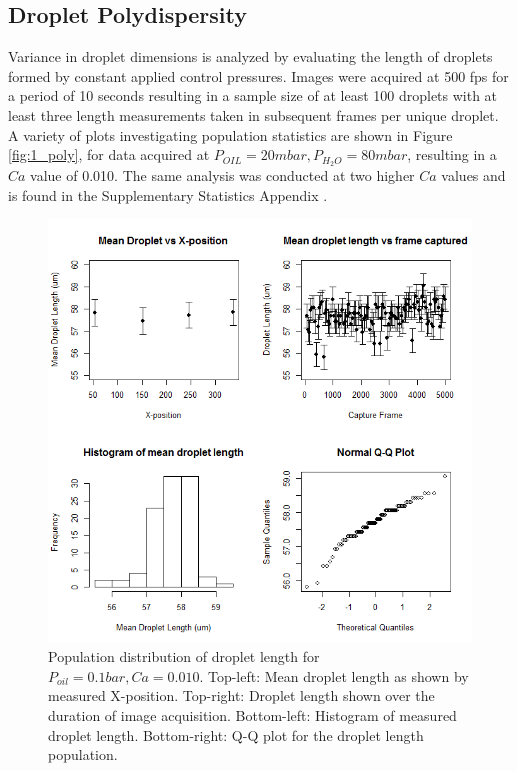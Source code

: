 \clearpage

\subsection{Droplet Polydispersity}

Variance in droplet dimensions is analyzed by evaluating the length of droplets formed by constant applied control pressures. Images were acquired at 500 fps for a period of 10 seconds resulting in a sample size of at least 100 droplets with at least three length measurements taken in subsequent frames per unique droplet. A variety of plots investigating population statistics are shown in Figure \vref{fig:1_poly}, for data acquired at $P_{OIL} = 20mbar,  P_{H_2O} = 80mbar$, resulting in a $Ca$ value of 0.010. The same analysis was conducted at two higher $Ca$ values and is found in the Supplementary Statistics Appendix .

\begin{figure}[H]
\centering 
\includegraphics[width=0.90\columnwidth]{1_poly.PNG} 
\caption[Polydispersity]{Population distribution of droplet length for $P_{oil} = 0.1 bar, Ca = 0.010$. Top-left: Mean droplet length as shown by measured X-position. Top-right: Droplet length shown over the duration of image acquisition. Bottom-left: Histogram of measured droplet length. Bottom-right: Q-Q plot for the droplet length population.} 
\label{fig:1_poly} 
\end{figure}

